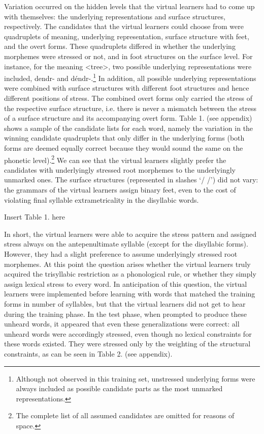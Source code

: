 \documentclass[a4paper]{article}
\begin{document}
Variation occurred on the hidden levels that the virtual learners had to come up with themselves: the underlying representations and surface structures, respectively. The candidates that the virtual learners could choose from were quadruplets of meaning, underlying representation, surface structure with feet, and the overt forms. These quadruplets differed in whether the underlying morphemes were stressed or not, and in foot structures on the surface level. For instance, for the meaning {\textless}tree{\textgreater}, two possible underlying representations were included, {\textbar}dendr-{\textbar} and {\textbar}déndr-{\textbar}.\footnote{ Although not observed in this training set, unstressed underlying forms were always included as possible candidate parts as the most unmarked representations.} In addition, all possible underlying representations were combined with surface structures with different foot structures and hence different positions of stress. The combined overt forms only carried the stress of the respective surface structure, i.e. there is never a mismatch between the stress of a surface structure and its accompanying overt form. Table 1. (see appendix) shows a sample of the candidate lists for each word, namely the variation in the winning candidate quadruplets that only differ in the underlying forms (both forms are deemed equally correct because they would sound the same on the phonetic level).\footnote{ The complete list of all assumed candidates are omitted for reasons of space.} We can see that the virtual learners slightly prefer the candidates with underlyingly stressed root morphemes to the underlyingly unmarked ones. The surface structures (represented in slashes ‘/ /’) did not vary: the grammars of the virtual learners assign binary feet, even to the cost of violating final syllable extrametricality in the disyllabic words.

{\centering
Insert Table 1. here
\par}

In short, the virtual learners were able to acquire the stress pattern and assigned stress always on the antepenultimate syllable (except for the disyllabic forms). However, they had a slight preference to assume underlyingly stressed root morphemes. At this point the question arises whether the virtual learners truly acquired the trisyllabic restriction as a phonological rule, or whether they simply assign lexical stress to every word. In anticipation of this question, the virtual learners were implemented before learning with words that matched the training forms in number of syllables, but that the virtual learners did not get to hear during the training phase. In the test phase, when prompted to produce these unheard words, it appeared that even these generalizations were correct: all unheard words were accordingly stressed, even though no lexical constraints for these words existed. They were stressed only by the weighting of the structural constraints, as can be seen in Table 2. (see appendix).
\end{document}
